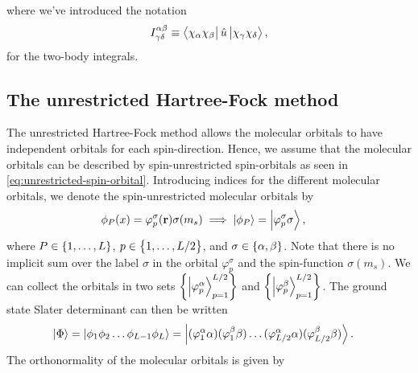                 where we've introduced the notation
                \begin{align}
                    I^{\alpha\beta}_{\gamma\delta}
                    \equiv \bra{\chi_{\alpha}\chi_{\beta}}
                    \hat{u}
                    \ket{\chi_{\gamma}\chi_{\delta}},
                \end{align}
                for the two-body integrals.

        \subsection{The unrestricted Hartree-Fock method}
            The unrestricted Hartree-Fock method allows the molecular orbitals
            to have independent orbitals for each spin-direction.
            Hence, we assume that the molecular orbitals can be described by
            spin-unrestricted spin-orbitals as seen in
            \autoref{eq:unrestricted-spin-orbital}.
            Introducing indices for the different molecular orbitals, we denote
            the spin-unrestricted molecular orbitals by
            \begin{align}
                \phi_P(x)
                &=
                \varphi^{\sigma}_{p}(\mathbf{r})
                \sigma(m_s)
                \implies
                \ket{\phi_P}
                = \ket{\varphi^{\sigma}_{p}\sigma},
            \end{align}
            where $P \in \left\{ 1, \dots, L \right\}$, $p \in \left\{ 1, \dots, L / 2 \right\}$,
            and $\sigma \in \left\{ \alpha, \beta \right\}$.
            Note that there is no implicit sum over the label $\sigma$ in the
            orbital $\varphi^{\sigma}_{p}$ and the spin-function $\sigma(m_s)$.
            We can collect the orbitals in two sets
            $\left\{ \ket{\varphi^{\alpha}_{p}}_{p = 1}^{L / 2} \right\}$ and
            $\left\{ \ket{\varphi^{\beta}_{p}}_{p = 1}^{L / 2} \right\}$.
            The ground state Slater determinant can then be written
            \begin{align}
                \ket{\Phi}
                &=
                \ket{\phi_1 \phi_2 \dots \phi_{L - 1} \phi_L}
                =
                \ket{
                    (\varphi^{\alpha}_{1}\alpha)
                    (\varphi^{\beta}_{1}\beta)
                    \dots
                    (\varphi^{\alpha}_{L/2}\alpha)
                    (\varphi^{\beta}_{L/2}\beta)
                }.
            \end{align}
            The orthonormality of the molecular orbitals is given by
